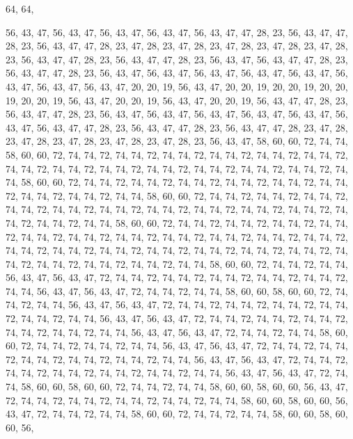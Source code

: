 64, 64,

56, 43, 47, 56, 43, 47, 56, 43, 47, 56, 43, 47, 56, 43, 47, 47, 28, 23, 56, 43, 47, 47, 28, 23, 56, 43, 47, 47, 28, 23, 47, 28, 23, 47, 28, 23, 47, 28, 23, 47, 28, 23, 47, 28, 23, 56, 43, 47, 47, 28, 23, 56, 43, 47, 47, 28, 23, 56, 43, 47, 56, 43, 47, 47,
28, 23, 56, 43, 47, 47, 28, 23, 56, 43, 47, 56, 43, 47, 56, 43, 47, 56, 43, 47, 56, 43, 47, 56, 43, 47, 56, 43, 47, 56, 43, 47, 20, 20, 19, 56, 43, 47, 20, 20, 19, 20, 20, 19, 20, 20, 19, 20, 20, 19, 56, 43, 47, 20, 20, 19, 56, 43, 47, 20, 20, 19, 56, 43,
47, 47, 28, 23, 56, 43, 47, 47, 28, 23, 56, 43, 47, 56, 43, 47, 56, 43, 47, 56, 43, 47, 56, 43, 47, 56, 43, 47, 56, 43, 47, 47, 28, 23, 56, 43, 47, 47, 28, 23, 56, 43, 47, 47, 28, 23, 47, 28, 23, 47, 28, 23, 47, 28, 23, 47, 28, 23, 47, 28, 23, 56, 43, 47,
58, 60, 60, 72, 74, 74, 58, 60, 60, 72, 74, 74, 72, 74, 74, 72, 74, 74, 72, 74, 74, 72, 74, 74, 72, 74, 74, 72, 74, 74, 72, 74, 74, 72, 74, 74, 72, 74, 74, 72, 74, 74, 72, 74, 74, 72, 74, 74, 72, 74, 74, 58, 60, 60, 72, 74, 74, 72, 74, 74, 72, 74, 74, 72,
74, 74, 72, 74, 74, 72, 74, 74, 72, 74, 74, 72, 74, 74, 72, 74, 74, 58, 60, 60, 72, 74, 74, 72, 74, 74, 72, 74, 74, 72, 74, 74, 72, 74, 74, 72, 74, 74, 72, 74, 74, 72, 74, 74, 72, 74, 74, 72, 74, 74, 72, 74, 74, 72, 74, 74, 72, 74, 74, 58, 60, 60, 72, 74,
74, 72, 74, 74, 72, 74, 74, 72, 74, 74, 72, 74, 74, 72, 74, 74, 72, 74, 74, 72, 74, 74, 72, 74, 74, 72, 74, 74, 72, 74, 74, 72, 74, 74, 72, 74, 74, 72, 74, 74, 72, 74, 74, 72, 74, 74, 72, 74, 74, 72, 74, 74, 72, 74, 74, 72, 74, 74, 72, 74, 74, 72, 74, 74,
72, 74, 74, 58, 60, 60, 72, 74, 74, 72, 74, 74, 56, 43, 47, 56, 43, 47, 72, 74, 74, 72, 74, 74, 72, 74, 74, 72, 74, 74, 72, 74, 74, 72, 74, 74, 56, 43, 47, 56, 43, 47, 72, 74, 74, 72, 74, 74, 58, 60, 60, 58, 60, 60, 72, 74, 74, 72, 74, 74, 56, 43, 47, 56,
43, 47, 72, 74, 74, 72, 74, 74, 72, 74, 74, 72, 74, 74, 72, 74, 74, 72, 74, 74, 56, 43, 47, 56, 43, 47, 72, 74, 74, 72, 74, 74, 72, 74, 74, 72, 74, 74, 72, 74, 74, 72, 74, 74, 56, 43, 47, 56, 43, 47, 72, 74, 74, 72, 74, 74, 58, 60, 60, 72, 74, 74, 72, 74,
74, 72, 74, 74, 56, 43, 47, 56, 43, 47, 72, 74, 74, 72, 74, 74, 72, 74, 74, 72, 74, 74, 72, 74, 74, 72, 74, 74, 56, 43, 47, 56, 43, 47, 72, 74, 74, 72, 74, 74, 72, 74, 74, 72, 74, 74, 72, 74, 74, 72, 74, 74, 56, 43, 47, 56, 43, 47, 72, 74, 74, 58, 60, 60,
58, 60, 60, 72, 74, 74, 72, 74, 74, 58, 60, 60, 58, 60, 60, 56, 43, 47, 72, 74, 74, 72, 74, 74, 72, 74, 74, 72, 74, 74, 72, 74, 74, 58, 60, 60, 58, 60, 60, 56, 43, 47, 72, 74, 74, 72, 74, 74, 58, 60, 60, 72, 74, 74, 72, 74, 74, 58, 60, 60, 58, 60, 60, 56,
